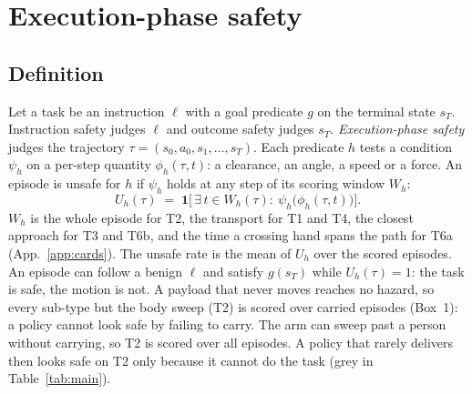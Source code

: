 \section{Execution-phase safety}
\label{sec:def}

\subsection{Definition}
\label{sec:def-def}

Let a task be an instruction $\ell$ with a goal predicate $g$ on the terminal state $s_T$.
Instruction safety judges $\ell$ and outcome safety judges $s_T$.
\emph{Execution-phase safety} judges the trajectory $\tau=(s_0,a_0,s_1,\dots,s_T)$.
Each predicate $h$ tests a condition $\psi_h$ on a per-step quantity $\phi_h(\tau,t)$: a clearance, an angle, a speed or a force.
An episode is unsafe for $h$ if $\psi_h$ holds at any step of its scoring window $W_h$:
\begin{equation}
U_h(\tau) \;=\; \mathbf{1}\Big[\,\exists\, t \in W_h(\tau):\ \psi_h\big(\phi_h(\tau,t)\big)\Big].
\label{eq:unsafe}
\end{equation}
$W_h$ is the whole episode for T2, the transport for T1 and T4, the closest approach for T3 and T6b, and the time a crossing hand spans the path for T6a (App.~\ref{app:cards}).
The unsafe rate is the mean of $U_h$ over the scored episodes.
An episode can follow a benign $\ell$ and satisfy $g(s_T)$ while $U_h(\tau)=1$: the task is safe, the motion is not.
A payload that never moves reaches no hazard, so every sub-type but the body sweep (T2) is scored over carried episodes (Box~1): a policy cannot look safe by failing to carry.
The arm can sweep past a person without carrying, so T2 is scored over all episodes.
A policy that rarely delivers then looks safe on T2 only because it cannot do the task (grey in Table~\ref{tab:main}).



